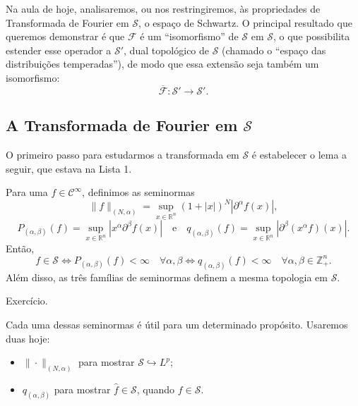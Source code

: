 \documentclass[../distribution_theory_notes.tex]{subfiles}
\begin{document}
Na aula de hoje, analisaremos, ou nos restringiremos, às propriedades de Transformada de Fourier em \(\mathcal{S}\), o espaço de Schwartz. O principal resultado que queremos demonstrar é que \(\mathcal{F}\) é um ``isomorfismo'' de \(\mathcal{S}\) em \(\mathcal{S}\), o que possibilita estender esse operador a \(\mathcal{S}'\), dual topológico de \(\mathcal{S}\) (chamado o ``espaço das distribuições temperadas''), de modo que essa extensão seja também um isomorfismo:
\[
	\overline{\mathcal{F}}:\mathcal{S}'\longrightarrow \mathcal{S}'.
\]

\subsection{A Transformada de Fourier em \(\mathcal{S}\)}
O primeiro passo para estudarmos a transformada em \(\mathcal{S}\) é estabelecer o lema a seguir, que estava na Lista 1.

\begin{lemma*}
	Para uma \(f\in \mathcal{C}^{\infty}\), definimos as seminormas
	\[
		\|f\|_{(N,\alpha )}
		=\sup_{x\in \mathbb{R}^{n}}(1+|x|)^{N}|\partial ^{\alpha }f(x)|,
	\]
	\[
		P_{(\alpha ,\beta )}(f)
		=\sup_{x\in \mathbb{R}^{n}}|x^{\alpha }\partial ^{\beta }f(x)|
		\quad \text{e}\quad
		q_{(\alpha ,\beta )}(f)
		=\sup_{x\in \mathbb{R}^{n}}|\partial ^{\beta }(x^{\alpha }f)(x)|.
	\]
	Então,
	\[
		f\in \mathcal{S}
		\Longleftrightarrow P_{(\alpha ,\beta )}(f)<\infty \quad \forall \alpha ,\beta
		\Longleftrightarrow q_{(\alpha ,\beta )}(f)<\infty \quad \forall \alpha ,\beta \in \mathbb{Z}_{+}^{n}.
	\]
	Além disso, as três famílias de seminormas definem a mesma topologia em \(\mathcal{S}\).
\end{lemma*}
\begin{proof*}
	Exercício. \qedsymbol
\end{proof*}

\begin{tcolorbox}[
		skin=enhanced,
		title=Observação,
		fonttitle=\bfseries,
		colframe=black,
		colbacktitle=cyan!75!white,
		colback=cyan!15,
		colbacklower=black,
		coltitle=black,
		drop fuzzy shadow
	]
	Cada uma dessas seminormas é útil para um determinado propósito. Usaremos duas hoje:
	\begin{itemize}
		\item[(1)] \(\|\cdot \|_{(N,\alpha )}\) para mostrar \(\mathcal{S}\hookrightarrow L^{p}\);
		\item[(2)] \(q_{(\alpha ,\beta )}\) para mostrar \(\hat{f}\in \mathcal{S}\), quando \(f\in \mathcal{S}\).
	\end{itemize}
\end{tcolorbox}
\end{document}
